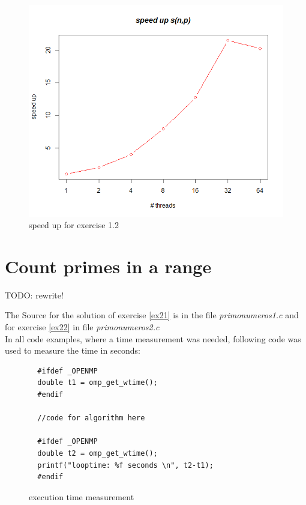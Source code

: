 \documentclass[11pt,a4paper]{article}
\begin{document}
\begin{figure}[h]
\centering
  \includegraphics[scale=0.35]{statistics/Ex12SpeedUpGraph.png}
	\caption{speed up for exercise 1.2}
	\label{ex12speedUp}
\end{figure}



\pagebreak

\section{Count primes in a range}

TODO: rewrite!

The Source for the solution of exercise \ref{ex21} is in the file
 \textit{primo\textunderscore numeros\textunderscore 1.c} and
 for exercise \ref{ex22} in file \textit{primo\textunderscore numeros\textunderscore 2.c} \\
 
In all code examples, where a time measurement was needed, following code was used to measure the time in seconds:
 
\begin{figure}[h]
\label{code_timemeasurement}
\begin{lstlisting}
  #ifdef _OPENMP
  double t1 = omp_get_wtime();
  #endif  
  
  //code for algorithm here
  
  #ifdef _OPENMP
  double t2 = omp_get_wtime();
  printf("looptime: %f seconds \n", t2-t1);
  #endif
\end{lstlisting} 
\caption{execution time measurement}
\end{figure} 
 
\end{document}
